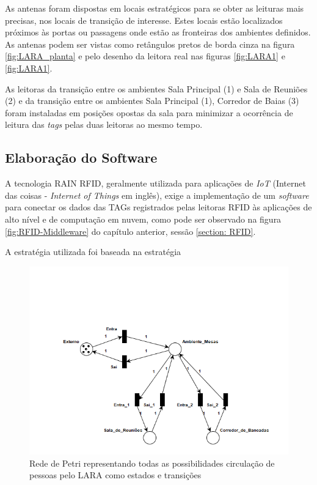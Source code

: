 As antenas foram dispostas em locais estratégicos para se obter as leituras mais precisas, nos locais de transição de interesse. Estes locais estão localizados próximos às portas ou passagens onde estão as fronteiras dos ambientes definidos. As antenas podem ser vistas como retângulos pretos de borda cinza na figura \ref{fig:LARA_planta} e pelo desenho da leitora real nas figuras \ref{fig:LARA1} e \ref{fig:LARA1}.

As leitoras da transição entre os ambientes Sala Principal (1) e Sala de Reuniões (2) e da transição entre os ambientes Sala Principal (1), Corredor de Baias (3) foram instaladas em posições opostas da sala para minimizar a ocorrência de leitura das \textit{tags} pelas duas leitoras ao mesmo tempo.

 \subsection{Elaboração do Software}
 
 A tecnologia RAIN RFID, geralmente utilizada para aplicações de \textit{IoT} (Internet das coisas - \textit{Internet of Things} em inglês), exige a implementação de um \textit{software} para conectar os dados das TAGs registrados pelas leitoras RFID às aplicações de alto nível e de computação em nuvem, como pode ser observado na figura \ref{fig:RFID-Middleware} do capítulo anterior, sessão \ref{section: RFID}.
 
 A estratégia utilizada foi baseada na estratégia
 

 
 
 \begin{figure}[H]
    \centering
    \includegraphics[width=0.8\linewidth]{figs/Metodologia/Petri_net.png}
    \caption{Rede de Petri representando todas as possibilidades circulação de pessoas pelo LARA como estados e transições}
    \label{fig:Petri1}
\end{figure}

